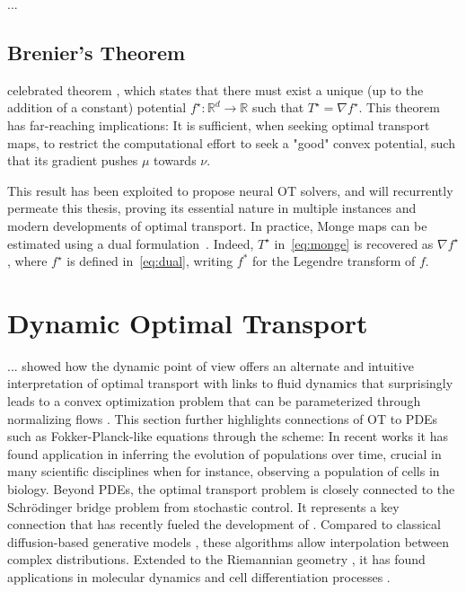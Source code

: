...

\subsection{Brenier's Theorem} \label{sec:background_brenier}

celebrated \citeauthor{brenier1987decomposition} theorem \citeyearpar{brenier1987decomposition}, which states that there must exist  a unique (up to the addition of a constant) potential $f^\star:\mathbb{R}^d\rightarrow \mathbb{R}$ such that $T^\star = \nabla f^\star$. 
This theorem has far-reaching implications: It is sufficient, when seeking optimal transport maps, to restrict the computational effort to seek a "good" convex potential, such that its gradient pushes $\mu$ towards $\nu$. 

This result has been exploited to propose neural OT solvers, and  will recurrently permeate this thesis, proving its essential nature in multiple instances and modern developments of optimal transport.
In practice, Monge maps can be estimated using a dual formulation~\citep{makkuva2020optimal, korotin2020wasserstein, bunne2022proximal, alvarez2021optimizing, mokrov2021large}. 
Indeed, $T^\star$ in~\eqref{eq:monge} is recovered as $\nabla f^\star$, where $f^\star$ is defined in~\eqref{eq:dual}, writing $f^*$ for the Legendre transform of $f$.

\section{Dynamic Optimal Transport} \label{sec:background_ot_dynamic}

...
\citet*{benamou2000computational} showed how the dynamic point of view offers an alternate and intuitive interpretation of optimal transport with links to fluid dynamics that surprisingly leads to a convex optimization problem that can be parameterized through normalizing flows \citep{tong2020trajectorynet}.
This section further highlights connections of OT to PDEs such as Fokker-Planck-like equations through the \citeauthor*{jordan1998variational} scheme: In recent works \citep{bunne2022proximal, alvarez2021optimizing, mokrov2021large, benamou2016augmented} 
it has found application in inferring the evolution of populations over time, crucial in many scientific disciplines when for instance, observing a population of cells in biology.
Beyond PDEs, the optimal transport problem is closely connected to the Schr\"odinger bridge problem from stochastic control. It represents a key connection that has recently fueled the development of  \citep{de2021diffusion, chen2021stochastic, bunne2022recovering, liu2022deep}. Compared to classical diffusion-based generative models \citep{daniels2021score, song2020score}, these algorithms allow interpolation between complex distributions. Extended to the Riemannian geometry \citep{thornton2022riemannian, de2022riemannian}, it has found applications in molecular dynamics \citep{holdijk2022path} and cell differentiation processes \citep{tong2023conditional, bunne2022recovering}.


